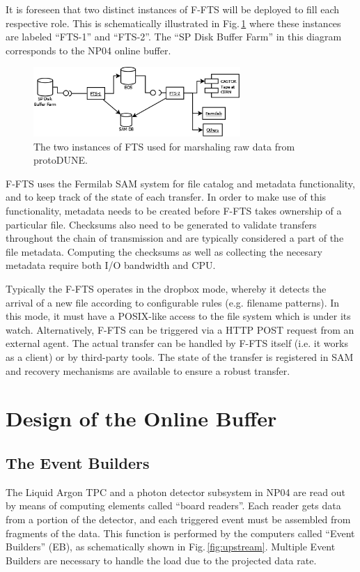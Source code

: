 \documentclass[pdftex,12pt,letter]{article}
\begin{document}
\noindent It is foreseen that two distinct instances of F-FTS will be deployed to fill each
respective role. This is schematically illustrated in Fig.\,\ref{fig:ftsinstances} where these instances are labeled ``FTS-1'' and ``FTS-2''.
The ``SP Disk Buffer Farm'' in this diagram corresponds to the NP04 online buffer.

\begin{figure}[tbh]
  \centering
  \includegraphics[width=0.7\textwidth]{figures/ftsinstances_v2.png}
  \caption{The two instances of FTS used for marshaling raw data from protoDUNE.}
  \label{fig:ftsinstances}
\end{figure}

 \noindent F-FTS uses the Fermilab SAM system for file catalog and metadata functionality,
and to keep track of the state of each transfer. In order to make use of this functionality, metadata
needs to be created before F-FTS takes ownership of a particular file. Checksums also need to be
generated to validate transfers throughout the chain of transmission and are typically considered
a part of the file metadata. Computing the checksums
as well as collecting the necesary metadata require both I/O bandwidth and CPU.

Typically the F-FTS operates in the dropbox mode, whereby it detects the arrival of a new file
according to configurable rules (e.g. filename patterns). In this mode, it must have a POSIX-like access to the file
system which is under its watch. Alternatively, F-FTS can be triggered via a HTTP POST request
from an external agent. The actual transfer can be handled by F-FTS itself (i.e. it works
as a client) or by third-party tools. The state of the transfer is registered in SAM
and recovery mechanisms are available to ensure a robust transfer.

\section{Design of the Online Buffer}
\subsection{The Event Builders}
The Liquid Argon TPC  and a photon detector subsystem in NP04 are read out by means of
computing elements called ``board readers''. Each reader gets data from a portion of the detector,
and each triggered event must be assembled  from fragments of the data. This function
is performed by the computers called ``Event Builders'' (EB), as schematically shown in Fig.\,\ref{fig:upstream}.
Multiple Event Builders are necessary to handle the load due to the projected data rate.
\end{document}
